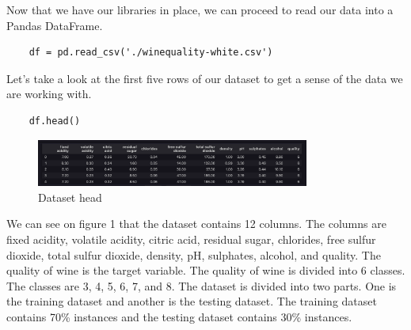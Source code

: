 \documentclass{report}
\begin{document}
\vspace*{0.5cm}

Now that we have our libraries in place, we can proceed to read our data into a Pandas DataFrame.\\
\begin{lstlisting}
    df = pd.read_csv('./winequality-white.csv')
\end{lstlisting}



Let's take a look at the first five rows of our dataset to get a sense of the data we are working with.\\
\begin{lstlisting}
    df.head()
\end{lstlisting}

\begin{figure}
    \centering
    \includegraphics[width=0.8\textwidth]{images/1.png}
    \caption{Dataset head}
    \label{fig:dataset tail}
\end{figure}

\pagebreak


We can see on figure 1 that the dataset contains 12 columns. The columns are fixed acidity, volatile acidity, citric acid, residual sugar, chlorides, free sulfur dioxide, total sulfur dioxide, density, pH, sulphates, alcohol, and quality. The quality of wine is the target variable. The quality of wine is divided into 6 classes. The classes are 3, 4, 5, 6, 7, and 8. The dataset is divided into two parts. One is the training dataset and another is the testing dataset. The training dataset contains 70\% instances and the testing dataset contains 30\% instances.\\
\end{document}
